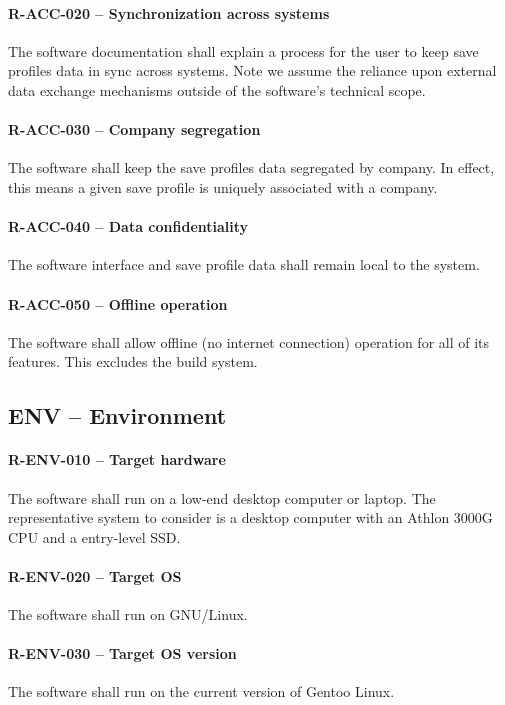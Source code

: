 \paragraph{R-ACC-020 -- Synchronization across systems}
The software documentation shall explain a process for the user to keep save
profiles data in sync across systems. Note we assume the reliance upon external
data exchange mechanisms outside of the software's technical scope.

\paragraph{R-ACC-030 -- Company segregation}
The software shall keep the save profiles data segregated by company.
In effect, this means a given save profile is uniquely associated with a
company.

\paragraph{R-ACC-040 -- Data confidentiality}
The software interface and save profile data shall remain local to the system.

\paragraph{R-ACC-050 -- Offline operation}
The software shall allow offline (no internet connection) operation for all of
its features. This excludes the build system.

\subsection{ENV -- Environment}
\paragraph{R-ENV-010 -- Target hardware}
The software shall run on a low-end desktop computer or laptop.
The representative system to consider is a desktop computer with
an Athlon 3000G \gls{CPU} and a entry-level \gls{SSD}.

\paragraph{R-ENV-020 -- Target OS}
The software shall run on GNU/Linux.

\paragraph{R-ENV-030 -- Target OS version}
The software shall run on the current version of Gentoo Linux.

